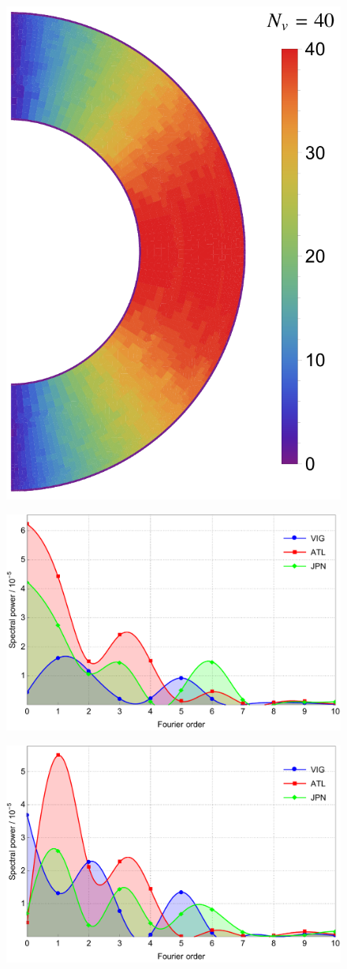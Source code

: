 \documentclass[extra]{gji}
\begin{document}
\begin{figure}
\begin{minipage}{0.4\textwidth}
    \label{fig:s2nv}\par \medskip \vfill
    \includegraphics[height=.9\textwidth]{fig/model/s4nv.pdf} 
    \label{fig:s4nv}\par \medskip \vfill
  \end{minipage}%
  \begin{minipage}{0.6\textwidth}
    \centering
    \includegraphics[height=.6\textwidth]{fig/model/s3pow.pdf} 
    \label{fig:s3pow}\par \medskip \vfill
    \includegraphics[height=.6\textwidth]{fig/model/s2pow.pdf} 

\end{minipage}
\end{figure}
\end{document}
